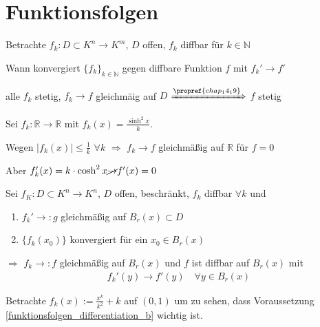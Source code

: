 \section{Funktionsfolgen}\setcounter{equation}{0}

Betrachte $f_k:D\subset K^n\to K^m$, $D$ offen, $f_k$ \gls{diffbar} für $k\in\mathbb{N}$

\begin{underlinedenvironment}[Frage]
	Wann konvergiert $\{ f_k\}_{k\in\mathbb{N}}$ gegen \gls{diffbar}e Funktion $f$ mit $f_k'\to f'$
\end{underlinedenvironment}

\begin{underlinedenvironment}[Wiederholung]
	alle $f_k$ stetig, $f_k\to f$ gleichmäig auf $D$ $\xRightarrow{\propref{chap_14_19}}$ $f$ stetig
\end{underlinedenvironment}

\begin{example}
	Sei $f_k:\mathbb{R}\to\mathbb{R}$ mit $f_k(x) = \frac{\sinh^2 x}{k}$.
	
	Wegen $\vert f_k(x)\vert \le \frac{1}{k}$ $\forall k$ $\Rightarrow$ $f_k\to f$ gleichmäßig auf $\mathbb{R}$ für $f=0$

	Aber $f_k'(x) = k\cdot\cosh^2 x \cancel{\rightarrow} f'(x) = 0$
\end{example}

\begin{proposition}
	Sei $f_K:D\subset K^n\to K^n$, $D$ offen, beschränkt, $f_k$ \gls{diffbar} $\forall k$ und\begin{enumerate}[label={(\alph*)}]
		\item $f_k'\rightarrow: g$ gleichmäßig auf $B_r(x)\subset D$
		\item {} $\{ f_k(x_0)\}$ konvergiert für ein $x_0\in B_r(x)$
	\end{enumerate}
	$\Rightarrow$ $f_k\rightarrow: f$ gleichmäßig auf $B_r(x)$ und $f$ ist \gls{diffbar} auf $B_r(x)$ mit \begin{align*}
		f_k'(y) \rightarrow f'(y) \quad\forall y\in B_r(x)
	\end{align*}
\end{proposition}

\begin{underlinedenvironment}[Hinweis]
	Betrachte $f_k(x) := \frac{x^k}{k^2} + k$ auf $(0,1)$ um zu sehen, dass Voraussetzung \ref{funktionsfolgen_differentiation_b} wichtig ist.
\end{underlinedenvironment}

